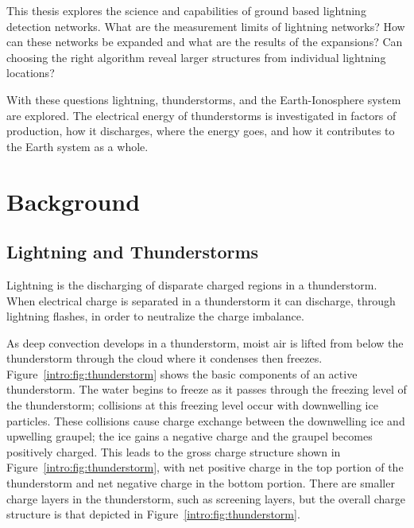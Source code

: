 This thesis explores the science and capabilities of ground based lightning detection networks.
What are the measurement limits of lightning networks?
How can these networks be expanded and what are the results of the expansions?
Can choosing the right algorithm reveal larger structures from individual lightning locations?

With these questions lightning, thunderstorms, and the Earth-Ionosphere system are explored.
The electrical energy of thunderstorms is investigated in factors of production, how it discharges, where the energy goes, and how it contributes to the Earth system as a whole.

\section{Background}

\subsection{Lightning and Thunderstorms}

Lightning is the discharging of disparate charged regions in a thunderstorm.
When electrical charge is separated in a thunderstorm it can discharge, through lightning flashes, in order to neutralize the charge imbalance.

As deep convection develops in a thunderstorm, moist air is lifted from below the thunderstorm through the cloud where it condenses then freezes.
Figure~\ref{intro:fig:thunderstorm} shows the basic components of an active thunderstorm.
The water begins to freeze as it passes through the freezing level of the thunderstorm; collisions at this freezing level occur with downwelling ice particles.
These collisions cause charge exchange between the downwelling ice and upwelling graupel; the ice gains a negative charge and the graupel becomes positively charged.
This leads to the gross charge structure shown in Figure~\ref{intro:fig:thunderstorm}, with net positive charge in the top portion of the thunderstorm and net negative charge in the bottom portion.
There are smaller charge layers in the thunderstorm, such as screening layers, but the overall charge structure is that depicted in Figure~\ref{intro:fig:thunderstorm}.

